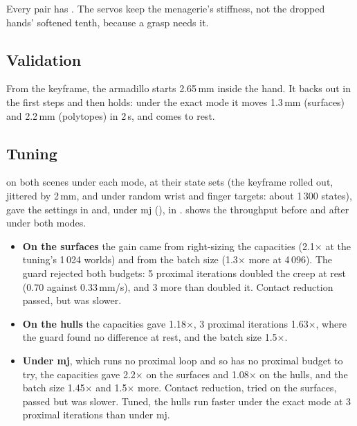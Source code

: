 Every pair has . The servos keep the menagerie's stiffness, not the dropped hands' softened tenth, because a grasp needs it.

\subsection{Validation}\label{sec:exvalidate}

From the keyframe, the armadillo starts 2.65\,mm inside the hand. It backs out in the first steps and then holds: under the exact mode it moves 1.3\,mm (surfaces) and 2.2\,mm (polytopes) in 2\,s, and comes to rest.

\subsection{Tuning}\label{sec:extuning}

 on both scenes under each mode, at their state sets (the keyframe rolled out, jittered by 2\,mm, and under random wrist and finger targets: about 1\,300 states), gave the settings in  and, under mj (), in .  shows the throughput before and after under both modes.
\begin{itemize}
\item \textbf{On the surfaces} the gain came from right-sizing the capacities (2.1$\times$ at the tuning's 1\,024 worlds) and from the batch size (1.3$\times$ more at 4\,096). The guard rejected both budgets: 5 proximal iterations doubled the creep at rest (0.70 against 0.33\,mm/s), and 3 more than doubled it. Contact reduction passed, but was slower.
\item \textbf{On the hulls} the capacities gave 1.18$\times$, 3 proximal iterations 1.63$\times$, where the guard found no difference at rest, and the batch size 1.5$\times$.
\item \textbf{Under mj}, which runs no proximal loop and so has no proximal budget to try, the capacities gave 2.2$\times$ on the surfaces and 1.08$\times$ on the hulls, and the batch size 1.45$\times$ and 1.5$\times$ more. Contact reduction, tried on the surfaces, passed but was slower. Tuned, the hulls run faster under the exact mode at 3 proximal iterations than under mj.
\end{itemize}

\begin{table}[t]
\centering
\caption{World-steps per second on an RTX 4080, before (the scene's own settings, at the batch it fits) and after tuning, both scenes tuned on 2026-11-01 under the exact mode and, ``(mj)'', under mj. From  and ; ``prox'' $n$: ; the performance guide has every scene.}
\label{tab:extune}
\small

\end{table}

